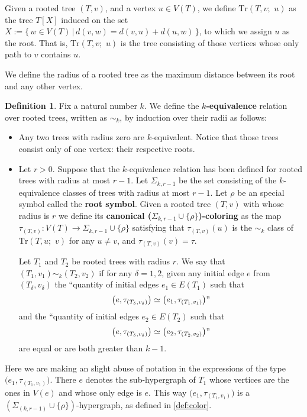 \documentclass[12pt,notitlepage,a4paper]{article}
\theoremstyle{definition}
\newtheorem{definition}{Definition}[section]
\begin{document}
%
Given a rooted tree $(T, v)$, and a vertex $u\in V(T)$, 
we define $\mathrm{Tr}(T,v;\,\, u)$ as the tree $T[X]$ induced on the
set $X:=\{ \, w\in V(T) \, | \, d(v,w)=d(v,u)+ d(u,w) \,  \}
$, to which we assign $u$ as the root.
That is, $\mathrm{Tr}(T,v;\,\, u)$ is the tree consisting of those vertices
whose only path to $v$ contains $u$.
\par
We define the radius of a rooted tree
as the maximum distance between its root
and any other vertex. \par

\begin{definition}

Fix a natural number $k$. We define the
\textbf{$k$-equivalence} relation over rooted trees, 
written as $\sim_k$, by induction over their radii as follows:

\begin{itemize}
	\item Any two trees with radius zero are $k$-equivalent.
	Notice that those trees
	consist only of one vertex: their respective roots.
	
	\item Let $r>0$.
	Suppose that the $k$-equivalence relation has been
	defined for rooted trees with radius at most $r-1$. Let $\Sigma_{k,r-1}$
	be the set consisting of the $k$-equivalence classes of trees
	with radius at most $r-1$. Let $\rho$ be an special symbol called the
	\textbf{root symbol}.
	Given a rooted tree $(T,v)$ with whose radius is $r$
	we define its \textbf{canonical ($\Sigma_{k,r-1}\cup \{\rho\}$)-coloring}
	as the map 
	$\tau_{(T,v)}: V(T)\rightarrow \Sigma_{k,r-1}\cup \{\rho\}$ satisfying that
	 $\tau_{(T,v)}(u)$ is the
	$\sim_k$ class of $\mathrm{Tr}(T,u;\, \,v)$
	for any $u\neq v$, and $\tau_{(T,v)}(v)=\tau$. \par
	Let $T_1$ and $T_2$ be rooted trees with radius $r$. 
	We say that $(T_1,v_1)\sim_k (T_2,v_2)$ 
	if for any $\delta=1,2$, given any initial edge 
	$e$ from $(T_\delta,v_\delta)$	the
	``quantity of initial edges $e_1\in E(T_1)$ such that
	\[
	\big(e,\tau_{(T_\delta,v_\delta)}\big)
	\simeq \big(e_1,\tau_{(T_1,v_1)}\big)" 
	\] and the
	``quantity of initial edges $e_2\in E(T_2)$ such that
	\[
	\big(e,\tau_{(T_\delta,v_\delta)}\big)
	\simeq \big(e_2,\tau_{(T_2,v_2)}\big)"\] are equal or
	are both greater than $k-1$.
\end{itemize}
Here we are making an slight abuse of notation in the expressions of the
type $\big(e_1,\tau_{(T_1,v_1)}\big)$. There $e$ denotes the 
sub-hypergraph of $T_1$ whose vertices are the ones in $V(e)$ and whose
only edge is $e$. This way $\big(e_1,\tau_{(T_1,v_1)}\big)$ is a 
$(\Sigma_{(k,r-1)}\cup \{\rho\})$-hypergraph, as defined in \cref{def:color}.
\end{definition}
\end{document}

